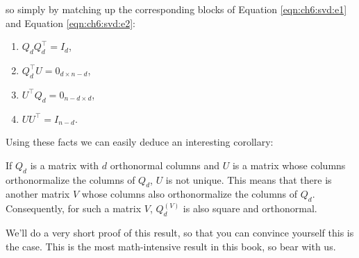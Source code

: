 so simply by matching up the corresponding blocks of Equation \eqref{eqn:ch6:svd:e1} and Equation \ref{eqn:ch6:svd:e2}:
\begin{enumerate}
    \item $Q_d Q_d^\top = I_d$,
    \item $Q_d^\top U = 0_{d \times n - d}$,
    \item $U^\top Q_d = 0_{n - d \times d}$,
    \item $UU^\top = I_{n - d}$.
\end{enumerate}


Using these facts we can easily deduce an interesting corollary:
\begin{corollary}
If $Q_d$ is a matrix with $d$ orthonormal columns and $U$ is a matrix whose columns orthonormalize the columns of $Q_d$, $U$ is not unique. This means that there is another matrix $V$ whose columns also orthonormalize the columns of $Q_d$. Consequently, for such a matrix $V$, $Q_d^{(V)}$ is also square and orthonormal.
\end{corollary}
We'll do a very short proof of this result, so that you can convince yourself this is the case. This is the most math-intensive result in this book, so bear with us. 
